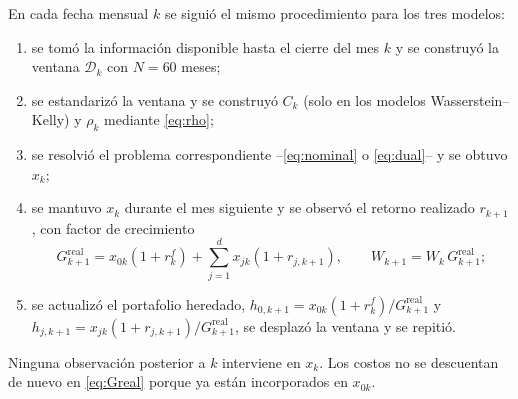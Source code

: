  En cada fecha mensual $k$ se siguió el mismo procedimiento para los tres modelos:
\begin{enumerate}[label=\arabic*.]
    \item se tomó la información disponible hasta el cierre del mes $k$ y se construyó la ventana $\mathcal D_k$ con $N=60$ meses;
    \item se estandarizó la ventana y se construyó $C_k$ (solo en los modelos Wasserstein--Kelly) y $\rho_k$ mediante \eqref{eq:rho};
    \item se resolvió el problema correspondiente --\eqref{eq:nominal} o \eqref{eq:dual}-- y se obtuvo $x_k$;
    \item se mantuvo $x_k$ durante el mes siguiente y se observó el retorno realizado $r_{k+1}$, con factor de crecimiento
    \begin{equation}\label{eq:Greal}
    G^{\mathrm{real}}_{k+1}=x_{0k}(1+r^f_k)+\sum_{j=1}^d x_{jk}(1+r_{j,k+1}),\qquad W_{k+1}=W_k\,G^{\mathrm{real}}_{k+1};
    \end{equation}
    \item se actualizó el portafolio heredado, $h_{0,k+1}=x_{0k}(1+r^f_k)/G^{\mathrm{real}}_{k+1}$ y $h_{j,k+1}=x_{jk}(1+r_{j,k+1})/G^{\mathrm{real}}_{k+1}$, se desplazó la ventana y se repitió.
\end{enumerate}
Ninguna observación posterior a $k$ interviene en $x_k$. Los costos no se descuentan de nuevo en \eqref{eq:Greal} porque ya están incorporados en $x_{0k}$. 
